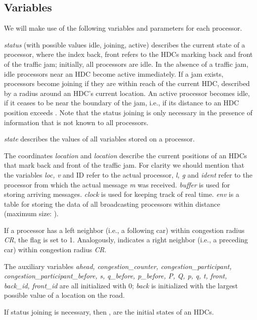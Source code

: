 \documentclass{acmrip}
\begin{document}
\subsection{Variables}

We will make use of the following variables and parameters for each
processor.


{\em status} (with possible values idle, joining, active)
describes the current state of a processor, where the index back, front refers to the HDCs marking back and front of the
traffic jam; initially, all processors are idle. In the absence of a
traffic jam, idle processors near an HDC become active
immediately. If a jam exists, processors become joining if they are
within reach of the current HDC, described by a radius
 around an HDC's current location.
An active processor becomes idle, if it ceases to be near the
boundary of the
jam, i.e., if its distance to an HDC position exceeds
. Note that the status joining is only necessary
in the presence of information that is not known to all processors.

{\em state} describes the values of all variables stored on a
processor.

The coordinates {\em location} and {\em location}
describe the current positions of an HDCs that mark back and front of
the traffic jam. For clarity we should mention that the variables
\textit{loc, v} and ID refer to the actual processor, \textit{l, g}
and \textit{ident} refer to the processor from which the actual
message \textit{m} was received. {\em buffer} is used for storing
arriving messages. {\em clock} is used for keeping track of real
time. {\em env} is a table for storing the data of all broadcasting
processors within distance  (maximum size: ).

If a processor has a left neighbor (i.e., a following car) within
congestion radius {\em CR}, the flag  is set to 1. Analogously, 
indicates a right neighbor (i.e., a preceding car) within congestion
radius {\em CR}.

The auxiliary variables {\em ahead, congestion\_counter,
congestion\_participant, congestion\_participant\_before, s,
q\_before, p\_before, P, Q, p, q, t, front,
back\_id, front\_id} are all initialized with 0; {\em back} is
initialized with the largest possible value of a location on the
road.

If status joining is necessary, then ,
 are the initial states of an HDCs.
\end{document}

